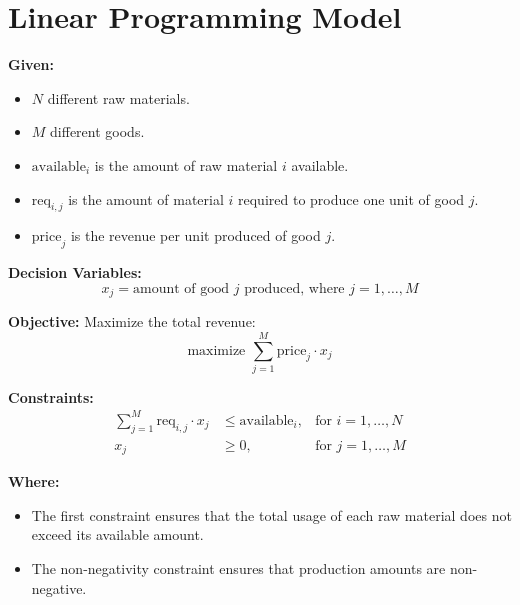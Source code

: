 \documentclass{article}
\begin{document}
\section*{Linear Programming Model}

\textbf{Given:}
\begin{itemize}
    \item \(N\) different raw materials.
    \item \(M\) different goods.
    \item \( \text{available}_i \) is the amount of raw material \(i\) available.
    \item \( \text{req}_{i,j} \) is the amount of material \(i\) required to produce one unit of good \(j\).
    \item \(\text{price}_j\) is the revenue per unit produced of good \(j\).
\end{itemize}

\textbf{Decision Variables:}
\[
x_j = \text{amount of good } j \text{ produced, where } j = 1, \ldots, M
\]

\textbf{Objective:}
Maximize the total revenue:
\[
\text{maximize } \sum_{j=1}^{M} \text{price}_j \cdot x_j
\]

\textbf{Constraints:}
\begin{align*}
\sum_{j=1}^{M} \text{req}_{i,j} \cdot x_j & \leq \text{available}_i, & \text{for } i = 1, \ldots, N \\
x_j & \geq 0, & \text{for } j = 1, \ldots, M
\end{align*}

\textbf{Where:}
\begin{itemize}
    \item The first constraint ensures that the total usage of each raw material does not exceed its available amount.
    \item The non-negativity constraint ensures that production amounts are non-negative.
\end{itemize}
\end{document}
